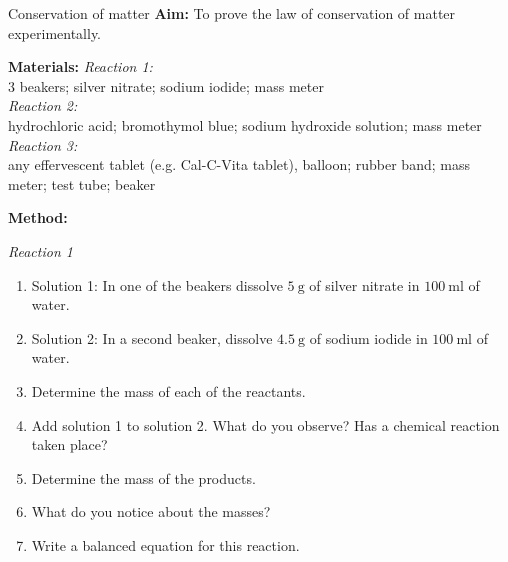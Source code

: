             \begin{i_experiment}{Conservation of matter}
            \nopagebreak
            \label{m38711*eip-453}\noindent{}\textbf{Aim:}
To prove the law of conservation of matter experimentally.
\par 
\label{m38711*eip792}\noindent{}\textbf{Materials:}
\textsl{Reaction 1:} \\
3 beakers; silver nitrate; sodium iodide; mass meter \\
\textsl{Reaction 2:} \\
 hydrochloric acid; bromothymol blue; sodium hydroxide solution; mass meter \\
 \textsl{Reaction 3:} \\
any effervescent tablet (e.g. Cal-C-Vita tablet), balloon; rubber band; mass meter; test tube; beaker
\par 
\label{m38711*eip-153}
	\par
      \label{m38711*id72432}\noindent
\textbf{Method:} \\
\begin{minipage}{.7\textwidth}
\textsl{Reaction 1} 
\label{m38711*id6342}\begin{enumerate}[noitemsep, label=\textbf{\arabic*}. ] 
            \item Solution 1: In one of the beakers dissolve $5~\text{g}$ of silver nitrate in $100~\text{ml}$ of water.
\item Solution 2: In a second beaker, dissolve $4.5~\text{g}$ of sodium iodide in $100~\text{ml}$ of water.
\item Determine the mass of each of the reactants.
\item Add solution 1 to solution 2. What do you observe? Has a chemical reaction taken place? 
\item Determine the mass of the products. 
\item What do you notice about the masses?
\item Write a balanced equation for this reaction.
\end{enumerate}
\end{minipage}
\begin{minipage}{.2\textwidth}
 \begin{center}
\end{center}
\end{minipage}
\end{i_experiment}
